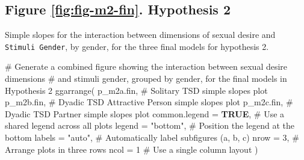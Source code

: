 \documentclass[
  bookmarksnumbered]{article}
\newenvironment{Shaded}{\begin{snugshade}}{\end{snugshade}}
\newcommand{\AttributeTok}[1]{\textcolor[rgb]{0.80,0.80,0.80}{#1}}
\newcommand{\CommentTok}[1]{\textcolor[rgb]{0.50,0.62,0.50}{#1}}
\newcommand{\ConstantTok}[1]{\textcolor[rgb]{0.86,0.64,0.64}{\textbf{#1}}}
\newcommand{\DecValTok}[1]{\textcolor[rgb]{0.86,0.86,0.80}{#1}}
\newcommand{\FunctionTok}[1]{\textcolor[rgb]{0.94,0.94,0.56}{#1}}
\newcommand{\NormalTok}[1]{\textcolor[rgb]{0.80,0.80,0.80}{#1}}
\newcommand{\StringTok}[1]{\textcolor[rgb]{0.80,0.58,0.58}{#1}}
\begin{document}
\subsection{Figure \ref{fig:fig-m2-fin}. Hypothesis 2}\label{figure-reffigfig-m2-fin.-hypothesis-2}

Simple slopes for the interaction between dimensions of sexual desire and \texttt{Stimuli\ Gender}, by gender, for the three final models for hypothesis 2.

\begin{Shaded}
\begin{Highlighting}[]
\CommentTok{\# Generate a combined figure showing the interaction between sexual desire dimensions}
\CommentTok{\# and stimuli gender, grouped by gender, for the final models in Hypothesis 2}
\FunctionTok{ggarrange}\NormalTok{(}
\NormalTok{  p\_m2a.fin, }\CommentTok{\# Solitary TSD simple slopes plot}
\NormalTok{  p\_m2b.fin, }\CommentTok{\# Dyadic TSD Attractive Person simple slopes plot}
\NormalTok{  p\_m2c.fin, }\CommentTok{\# Dyadic TSD Partner simple slopes plot}
  \AttributeTok{common.legend =} \ConstantTok{TRUE}\NormalTok{, }\CommentTok{\# Use a shared legend across all plots}
  \AttributeTok{legend =} \StringTok{"bottom"}\NormalTok{, }\CommentTok{\# Position the legend at the bottom}
  \AttributeTok{labels =} \StringTok{"auto"}\NormalTok{, }\CommentTok{\# Automatically label subfigures (a, b, c)}
  \AttributeTok{nrow =} \DecValTok{3}\NormalTok{, }\CommentTok{\# Arrange plots in three rows}
  \AttributeTok{ncol =} \DecValTok{1} \CommentTok{\# Use a single column layout}
\NormalTok{)}
\end{Highlighting}
\end{Shaded}
\end{document}
